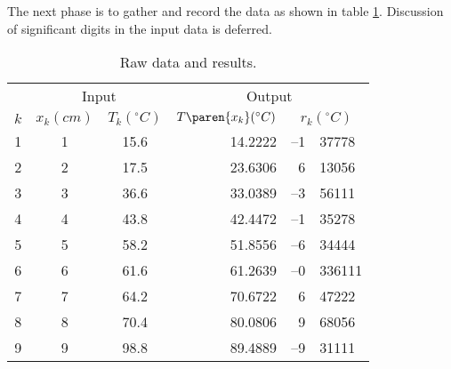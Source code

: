 The next phase is to gather and record the data as shown in table \ref{tab:bevington data and results}. Discussion of significant digits in the input data is deferred.
\begin{table}[h]
	\caption{Raw data and results.}
	\begin{center}
		\begin{tabular}{rcc|rr@{.}l}
		  & \multicolumn{2}{c}{Input} &  \multicolumn{3}{c}{Output} \\
		  $k$ & $x_{k} (cm) $ & $T_{k} (^{\circ}C)$ & $T\paren{x_{k}} (^{\circ}C)$ & \multicolumn{2}{c}{$r_{k} (^{\circ}C)$} \\\hline
			 1 & 1 & 15.6 & 14.2222 & --1 & 37778 \\
			 2 & 2 & 17.5 & 23.6306 &   6 & 13056 \\
			 3 & 3 & 36.6 & 33.0389 & --3 & 56111 \\
			 4 & 4 & 43.8 & 42.4472 & --1 & 35278 \\
			 5 & 5 & 58.2 & 51.8556 & --6 & 34444 \\
			 6 & 6 & 61.6 & 61.2639 & --0 & 336111 \\
			 7 & 7 & 64.2 & 70.6722 &   6 & 47222 \\
			 8 & 8 & 70.4 & 80.0806 &   9 & 68056 \\
			 9 & 9 & 98.8 & 89.4889 & --9 & 31111 \\
		\end{tabular}
	\end{center}
	\label{tab:bevington data and results}
\end{table}%

